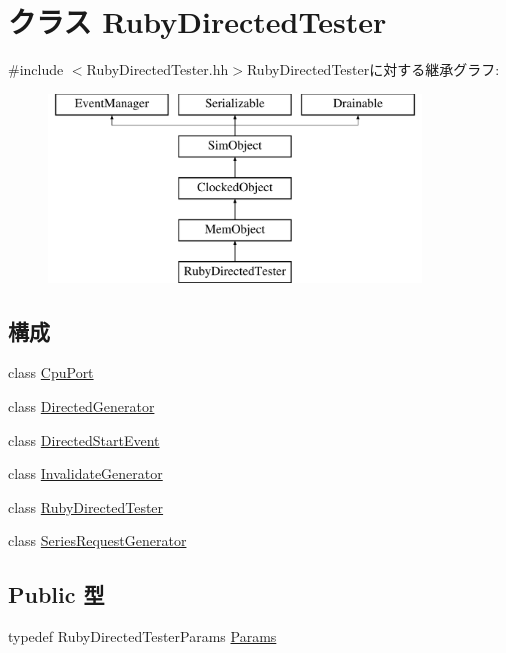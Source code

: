 \hypertarget{classRubyDirectedTester}{
\section{クラス RubyDirectedTester}
\label{classRubyDirectedTester}
}


{\ttfamily \#include $<$RubyDirectedTester.hh$>$}RubyDirectedTesterに対する継承グラフ:\begin{figure}[H]
\begin{center}
\leavevmode
\includegraphics[height=5cm]{classRubyDirectedTester}
\end{center}
\end{figure}
\subsection*{構成}
\begin{DoxyCompactItemize}
\item 
class \hyperlink{classRubyDirectedTester_1_1CpuPort}{CpuPort}
\item 
class \hyperlink{classRubyDirectedTester_1_1DirectedGenerator}{DirectedGenerator}
\item 
class \hyperlink{classRubyDirectedTester_1_1DirectedStartEvent}{DirectedStartEvent}
\item 
class \hyperlink{classRubyDirectedTester_1_1InvalidateGenerator}{InvalidateGenerator}
\item 
class \hyperlink{classRubyDirectedTester_1_1RubyDirectedTester}{RubyDirectedTester}
\item 
class \hyperlink{classRubyDirectedTester_1_1SeriesRequestGenerator}{SeriesRequestGenerator}
\end{DoxyCompactItemize}
\subsection*{Public 型}
\begin{DoxyCompactItemize}
\item 
typedef RubyDirectedTesterParams \hyperlink{classRubyDirectedTester_af24daccceb54fc519ecd978200efef2d}{Params}
\end{DoxyCompactItemize}
